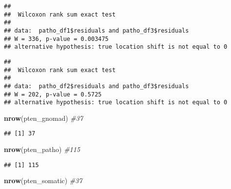 \documentclass[
]{article}
\newenvironment{Shaded}{\begin{snugshade}}{\end{snugshade}}
\newcommand{\CommentTok}[1]{\textcolor[rgb]{0.56,0.35,0.01}{\textit{#1}}}
\newcommand{\FunctionTok}[1]{\textcolor[rgb]{0.13,0.29,0.53}{\textbf{#1}}}
\newcommand{\NormalTok}[1]{#1}
\newcommand{\SpecialCharTok}[1]{\textcolor[rgb]{0.81,0.36,0.00}{\textbf{#1}}}
\begin{document}
\begin{Shaded}
\end{Shaded}

\begin{verbatim}
## 
##  Wilcoxon rank sum exact test
## 
## data:  patho_df1$residuals and patho_df3$residuals
## W = 336, p-value = 0.003475
## alternative hypothesis: true location shift is not equal to 0
\end{verbatim}

\begin{Shaded}
\end{Shaded}

\begin{verbatim}
## 
##  Wilcoxon rank sum exact test
## 
## data:  patho_df2$residuals and patho_df3$residuals
## W = 202, p-value = 0.5725
## alternative hypothesis: true location shift is not equal to 0
\end{verbatim}

\begin{Shaded}
\begin{Highlighting}[]
\FunctionTok{nrow}\NormalTok{(pten\_gnomad) }\CommentTok{\#37}
\end{Highlighting}
\end{Shaded}

\begin{verbatim}
## [1] 37
\end{verbatim}

\begin{Shaded}
\begin{Highlighting}[]
\FunctionTok{nrow}\NormalTok{(pten\_patho) }\CommentTok{\#115}
\end{Highlighting}
\end{Shaded}

\begin{verbatim}
## [1] 115
\end{verbatim}

\begin{Shaded}
\begin{Highlighting}[]
\FunctionTok{nrow}\NormalTok{(pten\_somatic) }\CommentTok{\#37}
\end{Highlighting}
\end{Shaded}
\end{document}
